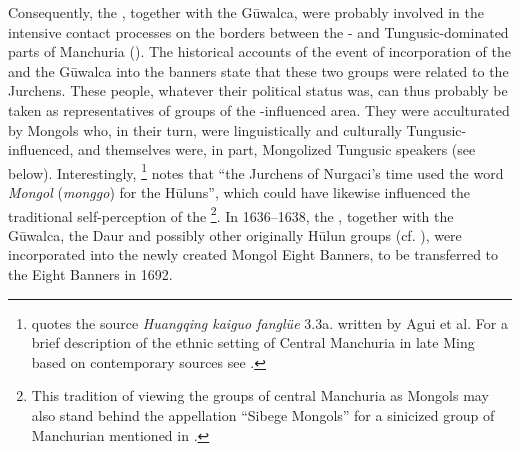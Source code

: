 \documentclass[output=paper,colorlinks,citecolor=brown]{langscibook}
\begin{document}
Consequently, the , together with the Gūwalca, were probably involved in the intensive contact processes on the borders between the - and Tungusic-dominated parts of Manchuria (\citealt[98--99]{Janhunen1996}). The historical accounts of the event of incorporation of the  and the Gūwalca into the  banners state that these two groups were related to the Jurchens. These people, whatever their political status was, can thus probably be taken as representatives of  groups of the -influenced area. They were acculturated by Mongols who, in their turn, were linguistically and culturally Tungusic-influenced, and themselves were, in part, Mongolized Tungusic speakers (see below). Interestingly, \citet[65]{Crossley2006}\footnote{\citet[65]{Crossley2006} quotes the source \textit{Huangqing kaiguo fanglüe} 3.3a. written by Agui et al. For a brief description of the ethnic setting of Central Manchuria in late Ming based on contemporary sources see \citet[64--66]{Crossley2006}.} notes that “the Jurchens of Nurgaci’s time used the word \textit{Mongol} (\textit{monggo}) for the Hūluns”, which could have likewise influenced the traditional self-perception of the \footnote{This tradition of viewing the  groups of central Manchuria as Mongols may also stand behind the appellation “Sibege Mongols” for a sinicized group of Manchurian  mentioned in \citet[225--227]{Lattimore1935}.}. In 1636--1638, the , together with the Gūwalca, the Daur and possibly other originally Hūlun groups (cf. \citealt[69--70]{Crossley2006}), were incorporated into the newly created Mongol Eight Banners, to be transferred to the  Eight Banners in 1692.\largerpage
\end{document}
